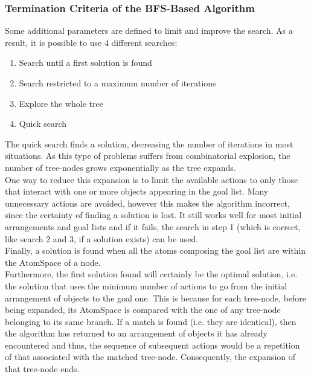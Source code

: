 \subsubsection{Termination Criteria of the BFS-Based Algorithm}\label{sec:term_criteria}

Some additional parameters are defined to limit and improve the search. As a result, it is possible to use 4 different searches:

\begin{enumerate}
	\item Search until a first solution is found
	\item Search restricted to a maximum number of iterations 
	\item Explore the whole tree
	\item Quick search
\end{enumerate}

The quick search finds a solution, decreasing the number of iterations in most situations.
As this type of problems suffers from combinatorial explosion\footnotemark{}, the number of tree-nodes grows exponentially as the tree expands.
 \\
One way to reduce this expansion is to limit the available actions to only those that interact with one or more objects appearing in the goal list.
Many unnecessary actions are avoided, however this makes the algorithm incorrect, since the certainty of finding a solution is lost.
It still works well for most initial arrangements and goal lists and if it fails, the search in step 1 (which is correct, like search 2 and 3, if a solution exists) can be used. \\

Finally, a solution is found when all the atoms composing the goal list are within the AtomSpace of a node. \\
Furthermore, the first solution found will certainly be the optimal solution, i.e. the solution that uses the minimum number of actions to go from the initial arrangement of objects to the goal one.
This is because for each tree-node, before being expanded, its AtomSpace is compared with the one of any tree-node belonging to its same branch.
If a match is found (i.e. they are identical), then the algorithm has returned to an arrangement of objects it has already encountered and thus, the sequence of subsequent actions would be a repetition of that associated with the matched tree-node. Consequently, the expansion of that tree-node ends.


